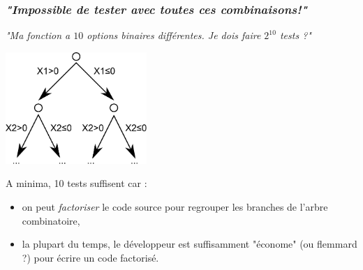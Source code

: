 \documentclass{beamer}
\begin{document}
\begin{frame}
\frametitle{\emph{"Impossible de tester avec toutes ces combinaisons!"}}

\emph{"Ma fonction a $10$ options binaires différentes. Je 
dois faire $2^{10}$ tests ?"}

\begin{center}
\includegraphics[width=0.4\textwidth]{combinatoire}
\end{center}

A minima, 10 tests suffisent car :
\begin{itemize}
\item on peut \emph{factoriser} le code source pour regrouper 
les branches de l'arbre combinatoire,
\item la plupart du temps, le développeur est suffisamment 
"économe" (ou flemmard ?) pour écrire un code 
factorisé.
\end{itemize}
\end{frame}

\end{document}
